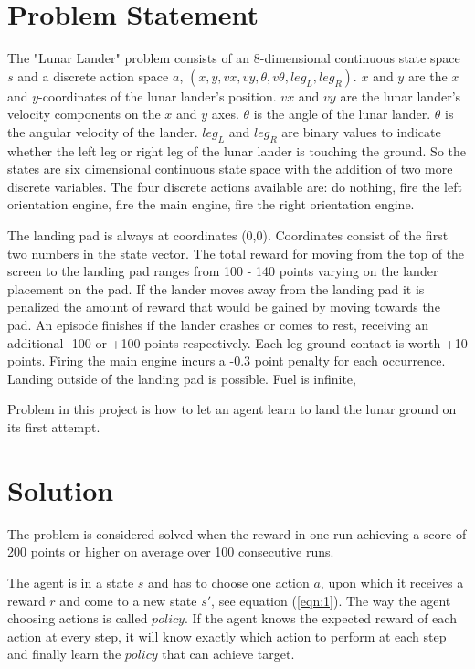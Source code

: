 \documentclass[conference]{IEEEtran}
\begin{document}
\section{Problem Statement}

The "Lunar Lander" problem consists of an 8-dimensional continuous state space $s$ and a discrete action space $a$, $(x, y, vx, vy, \theta, v\theta, leg_L, leg_R)$. $x$ and $y$ are the $x$ and $y$-coordinates of the lunar lander's position. $vx$ and $vy$ are the lunar lander's velocity components on the $x$ and $y$ axes. $\theta$ is the angle of the lunar lander. $\theta$ is the angular velocity of the lander. $leg_L$ and $leg_R$ are binary values to indicate whether the left leg or right leg of the lunar lander is touching the ground. So the states are six dimensional continuous state space with the addition of two more discrete variables. The four discrete actions available are: do nothing, fire the left orientation engine, fire the main engine, fire the right orientation engine.

The landing pad is always at coordinates (0,0). Coordinates consist of the first two numbers in the state vector. The total reward for moving from the top of the screen to the landing pad ranges from 100 - 140 points varying on the lander placement on the pad. If the lander moves away from the landing pad it is penalized the amount of reward that would be gained by moving towards the pad. An episode finishes if the lander crashes or comes to rest, receiving an additional -100 or +100 points respectively. Each leg ground contact is worth +10 points. Firing the main engine incurs a -0.3 point penalty for each occurrence. Landing outside of the landing pad is possible. Fuel is infinite, 

Problem in this project is how to let an agent learn to land the lunar ground on its first attempt. 

\section{Solution}

The problem is considered solved when the reward in one run achieving a score of 200 points or higher on average over 100 consecutive runs.

The agent is in a state $s$ and has to choose one action $a$, upon which it receives a reward $r$ and come to a new state $s{}'$, see equation (\ref{eqn:1}). The way the agent choosing actions is called $policy$. If the agent knows the expected reward of each action at every step, it will know exactly which action to perform at each step and finally learn the $policy$ that can achieve target.
\end{document}
